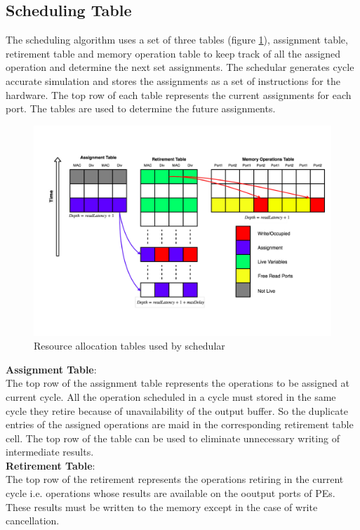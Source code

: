\subsection{Scheduling Table}
The scheduling algorithm uses a set of three tables (figure \ref{fig:sch:tableBlank}), assignment table, retirement table and 
memory operation table to keep track of all the assigned operation and determine the next set 
assignments. The schedular generates cycle accurate simulation and stores the assignments as
a set of instructions for the hardware. The top row of each table represents the current assignments
for each port. The tables are used to determine the future assignments. \\

\begin{figure}
    \centering
    \includegraphics[width = \linewidth]{./Scheduler/schedulartable.pdf}
    \caption{Resource allocation tables used by schedular}
    \label{fig:sch:tableBlank}
\end{figure}

\textbf{Assignment Table}: \\
The top row of the assignment table represents the operations to be assigned at current cycle.
All the operation scheduled in a cycle must stored in the same cycle they retire because of unavailability 
of the output buffer. So the duplicate entries of the assigned operations are maid in the corresponding
retirement table cell. The top row of the table can be used to eliminate unnecessary writing of intermediate
results. \\

\textbf{Retirement Table}: \\
The top row of the retirement represents the operations retiring in the current cycle i.e. operations
whose results are available on the ooutput ports of PEs. These results must be written to the memory except in the case of 
write cancellation. \\
\pagebreak

